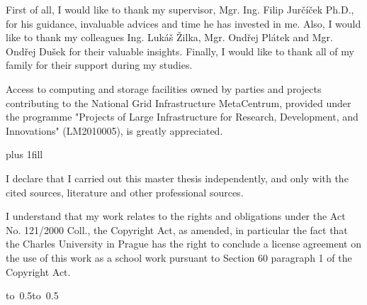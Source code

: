 \documentclass[12pt,a4paper]{report}
\let\openright=\clearpage
\begin{document}
\newpage



\openright

\noindent
First of all, I would like to thank my supervisor, Mgr. Ing. Filip Jurčíček Ph.D., for his guidance, invaluable advices and time he has invested in me.
Also, I would like to thank my colleagues Ing. Lukáš Žilka, Mgr. Ondřej Plátek and Mgr. Ondřej Dušek for their valuable insights.
Finally, I would like to thank all of my family for their support during my studies.

Access to computing and storage facilities owned by parties and projects contributing to the National Grid Infrastructure MetaCentrum,
  provided under the programme "Projects of Large Infrastructure for Research, Development, and Innovations" (LM2010005), is greatly appreciated.

\newpage


\vglue 0pt plus 1fill

\noindent
I declare that I carried out this master thesis independently, and only with the cited
sources, literature and other professional sources.

\medskip\noindent
I understand that my work relates to the rights and obligations under the Act No.
121/2000 Coll., the Copyright Act, as amended, in particular the fact that the Charles
University in Prague has the right to conclude a license agreement on the use of this
work as a school work pursuant to Section 60 paragraph 1 of the Copyright Act.

\vspace{10mm}

\hbox{\hbox to 0.5\hbox to 0.5}

\vspace{20mm}
\newpage

\end{document}
